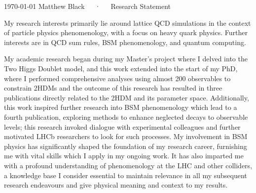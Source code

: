 \documentclass[11pt, a4paper]{awesome-cv}
\begin{document}
\makecvheader[R]

\makecvfooter
  {\today}
  {Matthew Black~~~·~~~Research Statement}
  {}


\begin{cvletter}

My research interests primarily lie around lattice QCD simulations in the context of particle physics phenomenology, with a focus on heavy quark physics.
Further interests are in QCD sum rules, BSM phenomenology, and quantum computing.

My academic research began during my Master's project where I delved into the Two Higgs Doublet model, and this work extended into the start of my PhD, where I performed comprehensive analyses using almost 200 observables to constrain 2HDMs and the outcome of this research has resulted in three publications directly related to the 2HDM and its parameter space. 
Additionally, this work inspired further research into BSM phenomenology which lead to a fourth publication, exploring methods to enhance neglected decays to observable levels; this research invoked dialogue with experimental colleagues and further motivated LHCb researchers to look for such processes.
My involvement in BSM physics has significantly shaped the foundation of my research career, furnishing me with vital skills which I apply in my ongoing work. 
It has also imparted me with a profound understanding of phenomenology at the LHC and other colliders, a knowledge base I consider essential to maintain relevance in all my subsequent research endeavours and give physical meaning and context to my results.


\end{cvletter}
\end{document}
